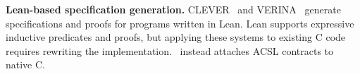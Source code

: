 \smallskip
\noindent\textbf{Lean-based specification generation.}
CLEVER~\cite{thakur2025clever} and VERINA~\cite{ye2026verina} generate specifications and proofs for programs written in Lean. Lean supports expressive inductive predicates and proofs, but applying these systems to existing C code requires rewriting the implementation. \toolname\ instead attaches ACSL contracts to native C.

\smallskip
\noindent {}
